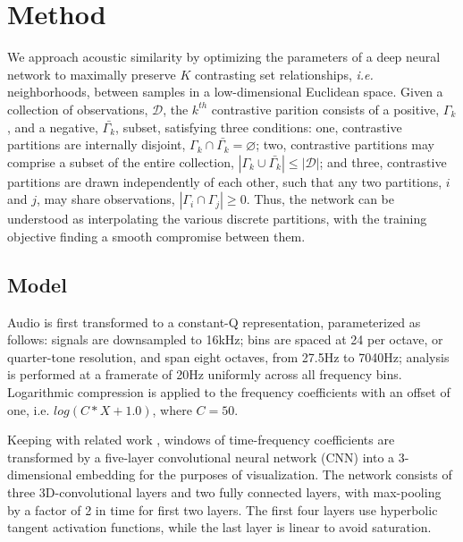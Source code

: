 \documentclass{article}
\begin{document}



\section{Method}

We approach acoustic similarity by optimizing the parameters of a deep neural network to maximally preserve $K$ contrasting set relationships, \emph{i.e.} neighborhoods, between samples in a low-dimensional Euclidean space.
Given a collection of observations, $\mathcal{D}$, the $k^{th}$ contrastive parition consists of a positive, $\Gamma_k$, and a negative, $\bar{\Gamma_k}$, subset, satisfying three conditions:
one, contrastive partitions are internally disjoint, $\Gamma_k \cap \bar{\Gamma_k} = \varnothing$;
two, contrastive partitions may comprise a subset of the entire collection, $|\Gamma_k \cup \bar{\Gamma_k}| \le |\mathcal{D}|$;
and three, contrastive partitions are drawn independently of each other, such that any two partitions, $i$ and $j$, may share observations, $|\Gamma_i \cap \Gamma_j| \ge 0$.
Thus, the network can be understood as interpolating the various discrete partitions, with the training objective finding a smooth compromise between them.


\subsection{Model}

Audio is first transformed to a constant-Q representation, parameterized as follows:
signals are downsampled to 16kHz;
bins are spaced at 24 per octave, or quarter-tone resolution, and span eight octaves, from 27.5Hz to 7040Hz;
analysis is performed at a framerate of 20Hz uniformly across all frequency bins.
Logarithmic compression is applied to the frequency coefficients with an offset of one, i.e. $log(C*X + 1.0)$, where $C=50$.

Keeping with related work \cite{humphrey2015dl4mir}, windows of time-frequency coefficients are transformed by a five-layer convolutional neural network (CNN) into a 3-dimensional embedding for the purposes of visualization.
The network consists of three 3D-convolutional layers and two fully connected layers, with max-pooling by a factor of 2 in time for first two layers.
The first four layers use hyperbolic tangent activation functions, while the last layer is linear to avoid saturation.
\end{document}
